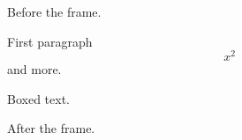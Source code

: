 \documentclass{article}
\begin{document}
Before the frame.
\begin{framed}
First paragraph $$x^2$$ and more.

\begin{minipage}{0.4\textwidth}Boxed text.\end{minipage}
\end{framed}
After the frame.
\end{document}
